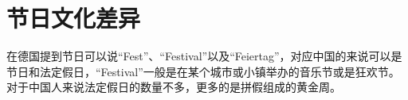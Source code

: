 \chapter{节日文化差异}
在德国提到节日可以说“Fest”、“Festival”以及“Feiertag”，对应中国的来说可以是节日和法定假日，“Festival”一般是在某个城市或小镇举办的音乐节或是狂欢节。对于中国人来说法定假日的数量不多，更多的是拼假组成的黄金周。



